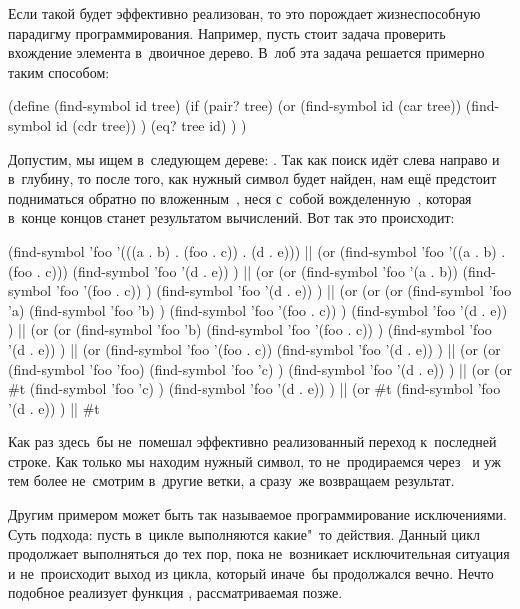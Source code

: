 Если такой  будет эффективно реализован, то это порождает
жизнеспособную парадигму программирования. Например, пусть стоит задача
проверить вхождение элемента в~двоичное дерево. В~лоб эта задача решается
примерно таким способом:

\begin{code:lisp}
(define (find-symbol id tree)
  (if (pair? tree)
      (or (find-symbol id (car tree))
          (find-symbol id (cdr tree)) )
      (eq? tree id) ) )
\end{code:lisp}

Допустим, мы ищем  в~следующем дереве: . Так как поиск идёт слева направо и в~глубину, то после того, как
нужный символ будет найден, нам ещё предстоит подниматься обратно по
вложенным~, неся с~собой вожделенную~, которая в~конце концов
станет результатом вычислений. Вот так это происходит:

\begin{code:lisp}
(find-symbol 'foo '(((a . b) . (foo . c)) . (d . e)))
|\Equals|   (or (find-symbol 'foo '((a . b) . (foo . c)))
       (find-symbol 'foo '(d . e)) )
|\Equals|   (or (or (find-symbol 'foo '(a . b))
           (find-symbol 'foo '(foo . c)) )
       (find-symbol 'foo '(d . e)) )
|\Equals|   (or (or (or (find-symbol 'foo 'a)
               (find-symbol 'foo 'b) )
           (find-symbol 'foo '(foo . c)) )
       (find-symbol 'foo '(d . e)) )
|\Equals|   (or (or (find-symbol 'foo 'b)
           (find-symbol 'foo '(foo . c)) )
       (find-symbol 'foo '(d . e)) )
|\Equals|   (or (find-symbol 'foo '(foo . c))
       (find-symbol 'foo '(d . e)) )
|\Equals|   (or (or (find-symbol 'foo 'foo)
           (find-symbol 'foo 'c) )
       (find-symbol 'foo '(d . e)) )
|\Equals|   (or (or #t
           (find-symbol 'foo 'c) )
       (find-symbol 'foo '(d . e)) )
|\Equals|   (or #t
       (find-symbol 'foo '(d . e)) )
|\is| #t
\end{code:lisp}

Как раз здесь~бы не~помешал эффективно реализованный переход к~последней строке.
Как только мы находим нужный символ, то не~продираемся через~ и уж тем
более не~смотрим в~другие ветки, а сразу~же возвращаем результат.

Другим примером может быть так называемое программирование исключениями. Суть
подхода: пусть в~цикле выполняются какие"~то действия. Данный цикл продолжает
выполняться до тех пор, пока не~возникает исключительная ситуация и
не~происходит выход из цикла, который иначе~бы продолжался вечно.
Нечто подобное реализует функция , рассматриваемая позже.

